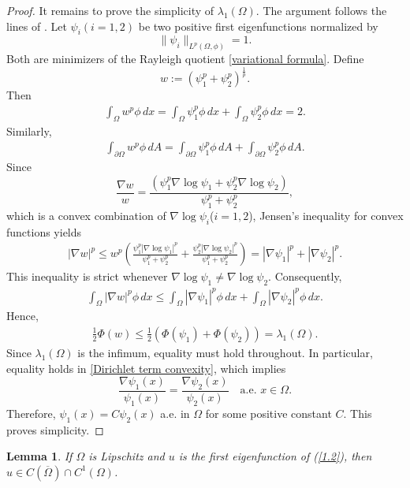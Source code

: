 \documentclass[11pt,leqno]{amsart}
\newtheorem{lemma}{Lemma}[section]
\newtheorem{remark}[theorem]{Remark}
\def\l{\lambda}
\numberwithin{equation}{section}
\begin{document}
\begin{proof}
It remains to prove the simplicity of $\lambda_{1}(\Omega)$. The argument follows the lines of \cite{Kawohl}.
Let $\psi_{i}(i=1,2)$ be two positive first eigenfunctions normalized by
$$\|\psi_{i}\|_{L^p(\Omega,\phi )}=1.$$ 
Both are minimizers of the Rayleigh quotient \eqref{variational formula}. Define 
$$w:=(\psi_{1}^{p}+\psi_{2}^{p})^{\frac{1}{p}}.$$ Then
    \begin{align*}
        \int_{\Omega}w^{p}\phi \, dx=\int_{\Omega}\psi_{1}^{p}\phi \, dx+\int_{\Omega}\psi_{2}^{p}\phi \, dx=2.
    \end{align*}
Similarly,
    \begin{align*}
        \int_{\partial \Omega}w^{p}\phi \, dA=\int_{\partial \Omega}\psi_{1}^{p}\phi \, dA+\int_{\partial \Omega}\psi_{2}^{p}\phi \, dA.
    \end{align*}
Since $$\frac{\nabla w}{w}=\frac{\left(\psi_1^p\nabla \log \psi_1+\psi_2^p\nabla \log \psi_2\right)}{\psi_1^p+\psi_2^p},$$ 
which is a convex combination of $\nabla \log \psi_i$($i=1,2$), Jensen's inequality for convex functions yields
\begin{align*}
|\nabla w|^p\leq w^p\left(\frac{\psi_1^p|\nabla \log \psi_1|^p}{\psi_1^p+\psi_2^p}+\frac{\psi_2^p|\nabla \log \psi_2|^p}{\psi_1^p+\psi_2^p}\right)=|\nabla \psi_1|^p+|\nabla \psi_2|^p.
\end{align*}
This inequality is strict whenever $\nabla \log \psi_1\neq \nabla \log \psi_2$.
Consequently, 
    \begin{align}\label{Dirichlet term convexity}
        \int_{\Omega}|\nabla w|^{p}\phi \, dx\leq \int_{\Omega}|\nabla \psi_{1}|^{p}\phi \, dx+\int_{\Omega}|\nabla\psi_{2}|^{p}\phi \, dx.
    \end{align}
Hence, 
\begin{align*}
   \frac{1} 2 \Phi(w)\leq \frac{1}{2}(\Phi (\psi_{1})+\Phi (\psi_{2}))= \lambda_{1}(\Omega).
\end{align*}
Since $\l_1(\Omega)$ is the infimum, equality must hold throughout. In particular,  equality  holds in \eqref{Dirichlet term convexity}, which implies
$$
\frac{\nabla \psi_{1}(x)}{\psi_{1}(x)}=\frac{\nabla \psi_{2}(x)}{\psi_{2}(x)}\quad \text{a.e. $x\in \Omega$}.
$$
Therefore,  $\psi_{1}(x)=C \psi_{2}(x)$ a.e. in $\Omega$ for some positive constant $C$. This proves simplicity.
\end{proof}
\begin{lemma}\label{lm2.1}
    If $\Omega$ is Lipschitz and $u$ is the first eigenfunction of (\ref{1.2}), then $u\in C(\overline{\Omega})\cap C^{1}(\Omega)$.
\end{lemma}
\end{document}
